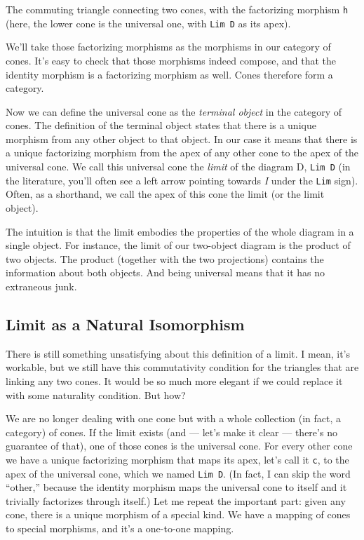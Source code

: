 The commuting triangle connecting two cones, with the factorizing
morphism \texttt{h}~ (here, the lower cone is the universal one, with
\texttt{Lim\ D} as its apex).

We'll take those factorizing morphisms as the morphisms in our category
of cones. It's easy to check that those morphisms indeed compose, and
that the identity morphism is a factorizing morphism as well. Cones
therefore form a category.

Now we can define the universal cone as the \emph{terminal object} in
the category of cones. The definition of the terminal object states that
there is a unique morphism from any other object to that object. In our
case it means that there is a unique factorizing morphism from the apex
of any other cone to the apex of the universal cone. We call this
universal cone the \emph{limit} of the diagram D, \texttt{Lim\ D} (in
the literature, you'll often see a left arrow pointing towards \emph{I}
under the \texttt{Lim} sign). Often, as a shorthand, we call the apex of
this cone the limit (or the limit object).

The intuition is that the limit embodies the properties of the whole
diagram in a single object. For instance, the limit of our two-object
diagram is the product of two objects. The product (together with the
two projections) contains the information about both objects. And being
universal means that it has no extraneous junk.

\subsection{Limit as a Natural
Isomorphism}\label{limit-as-a-natural-isomorphism}

There is still something unsatisfying about this definition of a limit.
I mean, it's workable, but we still have this commutativity condition
for the triangles that are linking any two cones. It would be so much
more elegant if we could replace it with some naturality condition. But
how?

We are no longer dealing with one cone but with a whole collection (in
fact, a category) of cones. If the limit exists (and --- let's make it
clear --- there's no guarantee of that), one of those cones is the
universal cone. For every other cone we have a unique factorizing
morphism that maps its apex, let's call it \texttt{c}, to the apex of
the universal cone, which we named \texttt{Lim\ D}. (In fact, I can skip
the word ``other,'' because the identity morphism maps the universal
cone to itself and it trivially factorizes through itself.) Let me
repeat the important part: given any cone, there is a unique morphism of
a special kind. We have a mapping of cones to special morphisms, and
it's a one-to-one mapping.

